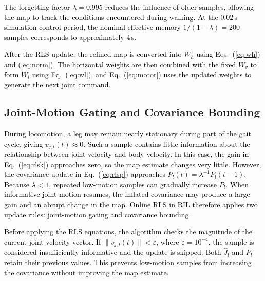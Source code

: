 \documentclass[a4paper, 10pt, conference]{ieeeconf}
\newcommand{\Jm}{J}
\newcommand{\oldtext}[1]{\textcolor{red}{}}
\newcommand{\newtext}[1]{\textcolor{black}{#1}}
\begin{document}
\newtext{The forgetting factor $\lambda=0.995$ reduces the influence of older samples,
allowing the map to track the conditions encountered during walking. At the
$0.02$\,s simulation control period, the nominal effective memory
$1/(1-\lambda)=200$ samples corresponds to approximately $4$\,s.}

\newtext{After the RLS update, the refined map is converted into $W_h$ using
Eqs.~(\ref{eq:wh}) and (\ref{eq:norm}). The horizontal weights are then combined
with the fixed $W_v$ to form $W_l$ using Eq.~(\ref{eq:wl}), and
Eq.~(\ref{eq:motor}) uses the updated weights to generate the next joint
command.}


\subsection{Joint-Motion Gating and Covariance Bounding}
\label{sec:stop}

\newtext{During locomotion, a leg may remain nearly stationary during part of
the gait cycle, giving $v_{j,l}(t)\approx0$. Such a sample contains little
information about the relationship between joint velocity and body velocity. In
this case, the gain in Eq.~(\ref{eq:rlsk}) approaches zero, so the map estimate
changes very little. However, the covariance update in
Eq.~(\ref{eq:rlsp}) approaches
$P_l(t)=\lambda^{-1}P_l(t-1)$. Because $\lambda<1$, repeated low-motion samples
can gradually increase $P_l$. When informative joint motion resumes, the
inflated covariance may produce a large gain and an abrupt change in the map.
Online RLS in RIL therefore applies two update rules: joint-motion gating and covariance bounding.}

\newtext{ Before applying the RLS equations, the
algorithm checks the magnitude of the current joint-velocity vector. If
$\lVert v_{j,l}(t)\rVert<\varepsilon$, where $\varepsilon=10^{-4}$, the sample
is considered insufficiently informative and the update is skipped. Both
$\hat{\Jm}_l$ and $P_l$ retain their previous values. This prevents low-motion
samples from increasing the covariance without improving the map estimate.}
\end{document}
